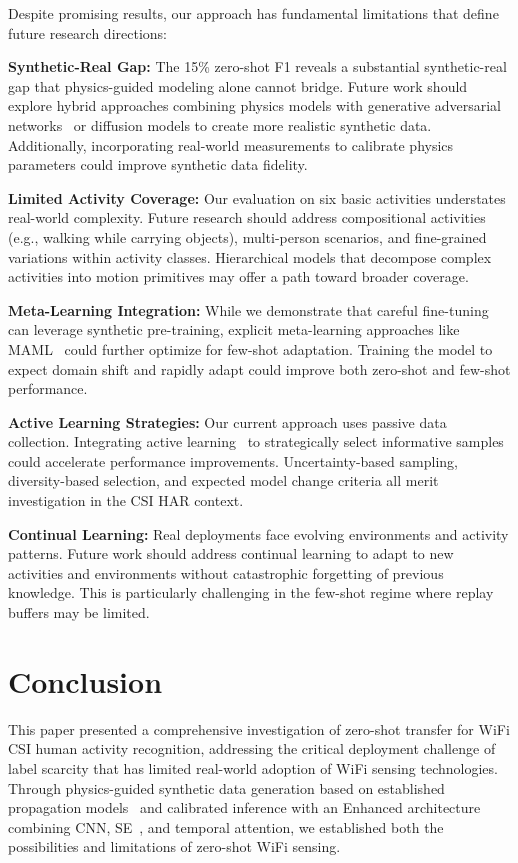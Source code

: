 \documentclass[journal]{IEEEtran}
\begin{document}
Despite promising results, our approach has fundamental limitations that define future research directions:

\textbf{Synthetic-Real Gap:} The 15\% zero-shot F1 reveals a substantial synthetic-real gap that physics-guided modeling alone cannot bridge. Future work should explore hybrid approaches combining physics models with generative adversarial networks~\cite{ganin2015unsupervised} or diffusion models to create more realistic synthetic data. Additionally, incorporating real-world measurements to calibrate physics parameters could improve synthetic data fidelity.

\textbf{Limited Activity Coverage:} Our evaluation on six basic activities understates real-world complexity. Future research should address compositional activities (e.g., walking while carrying objects), multi-person scenarios, and fine-grained variations within activity classes. Hierarchical models that decompose complex activities into motion primitives may offer a path toward broader coverage.

\textbf{Meta-Learning Integration:} While we demonstrate that careful fine-tuning can leverage synthetic pre-training, explicit meta-learning approaches like MAML~\cite{finn2017maml} could further optimize for few-shot adaptation. Training the model to expect domain shift and rapidly adapt could improve both zero-shot and few-shot performance.

\textbf{Active Learning Strategies:} Our current approach uses passive data collection. Integrating active learning~\cite{settles2009active} to strategically select informative samples could accelerate performance improvements. Uncertainty-based sampling, diversity-based selection, and expected model change criteria all merit investigation in the CSI HAR context.

\textbf{Continual Learning:} Real deployments face evolving environments and activity patterns. Future work should address continual learning to adapt to new activities and environments without catastrophic forgetting of previous knowledge. This is particularly challenging in the few-shot regime where replay buffers may be limited.

\section{Conclusion}

This paper presented a comprehensive investigation of zero-shot transfer for WiFi CSI human activity recognition, addressing the critical deployment challenge of label scarcity that has limited real-world adoption of WiFi sensing technologies. Through physics-guided synthetic data generation based on established propagation models~\cite{saleh1987statistical,goldsmith2005wireless} and calibrated inference with an Enhanced architecture combining CNN, SE~\cite{se_networks2018}, and temporal attention, we established both the possibilities and limitations of zero-shot WiFi sensing.
\end{document}
